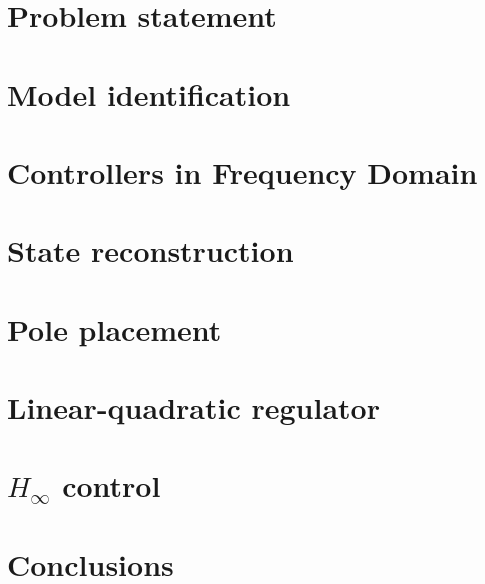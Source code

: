 \documentclass{report}
\begin{document}
	\newpage
	
	\tableofcontents
	\chapter{Problem statement}
		
	\chapter{Model identification}
		
	\chapter{Controllers in Frequency Domain}
		
	\chapter{State reconstruction}
		
	\chapter{Pole placement}
	  	
	\chapter{Linear-quadratic regulator}
		
	\chapter{\boldmath ${H_{\infty}}$ control}
		
	\chapter{Conclusions}
		
\end{document}
